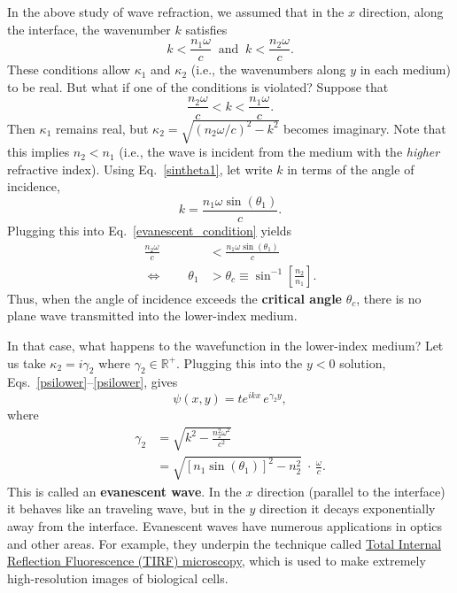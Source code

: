 \documentclass[10pt,a4paper]{article}
\begin{document}
In the above study of wave refraction, we assumed that in the $x$
direction, along the interface, the wavenumber $k$ satisfies
\begin{equation*}
  k < \frac{n_1\omega}{c} \;\;\textrm{and}\;\;
  k < \frac{n_2\omega}{c}.
\end{equation*}
These conditions allow $\kappa_1$ and $\kappa_2$ (i.e., the
wavenumbers along $y$ in each medium) to be real.  But what if one of
the conditions is violated?  Suppose that
\begin{equation}
  \frac{n_2\omega}{c} < k < \frac{n_1\omega}{c}.
  \label{evanescent_condition}
\end{equation}
Then $\kappa_1$ remains real, but $\kappa_2 =
\sqrt{(n_2\omega/c)^2-k^2}$ becomes imaginary.  Note that this implies
$n_2 < n_1$ (i.e., the wave is incident from the medium with the
\textit{higher} refractive index). Using Eq.~\eqref{sintheta1}, let
write $k$ in terms of the angle of incidence,
\begin{equation}
  k = \frac{n_1 \omega \sin(\theta_1)}{c}.
\end{equation}
Plugging this into Eq.~\eqref{evanescent_condition} yields
\begin{align}
  \frac{n_2\omega}{c} &< \frac{n_1 \omega \sin(\theta_1)}{c} \\
  \Leftrightarrow \qquad
  \theta_1 &> \theta_c \equiv  \sin^{-1}\left[\frac{n_2}{n_1}\right].
\end{align}
Thus, when the angle of incidence exceeds the \textbf{critical angle}
$\theta_c$, there is no plane wave transmitted into the lower-index
medium.

In that case, what happens to the wavefunction in the lower-index
medium?  Let us take $\kappa_2 = i \gamma_2$ where $\gamma_2 \in
\mathbb{R}^+$.  Plugging this into the $y < 0$ solution,
Eqs.~\eqref{psilower}--\eqref{psilower}, gives
\begin{equation}
  \psi(x,y) = t e^{ikx} \, e^{\gamma_2 y},
\end{equation}
where
\begin{align}
  \gamma_2 &= \sqrt{k^2 - \frac{n_2^2\omega^2}{c^2}} \\
  &= \sqrt{\left[n_1\sin(\theta_1)\right]^2 - n_2^2} \;\cdot\,\frac{\omega}{c}.
\end{align}
This is called an \textbf{evanescent wave}.  In the $x$ direction
(parallel to the interface) it behaves like an traveling wave, but in
the $y$ direction it decays exponentially away from the interface.
Evanescent waves have numerous applications in optics and other areas.
For example, they underpin the technique called
\href{https://en.wikipedia.org/wiki/Total_internal_reflection_fluorescence_microscope}{Total
  Internal Reflection Fluorescence (TIRF) microscopy}, which is used
to make extremely high-resolution images of biological cells.
\end{document}
